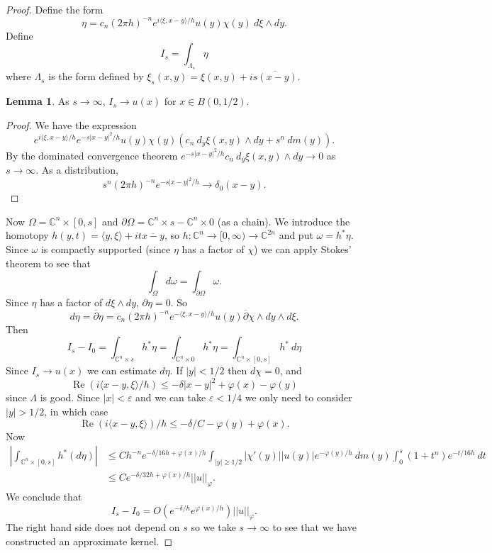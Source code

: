 \documentclass[12pt]{report}
\newcommand{\CC}{\mathbb{C}}
\newcommand{\dbar}{\overline \partial}
\renewcommand{\Re}{\operatorname{Re}}
\theoremstyle{definition}
\newtheorem{lemma}[theorem]{Lemma}
\begin{document}
\begin{proof}
    Define the form
    $$\eta = c_n(2\pi h)^{-n} e^{i\langle \xi, x - y\rangle/h} u(y)\chi(y) ~d\xi \wedge dy.$$
    Define $$I_s = \int_{\Lambda_s} \eta$$
    where $\Lambda_s$ is the form defined by $\xi_s(x, y) = \xi(x, y) + i\overline{s(x - y)}$.
\begin{lemma}
    As $s \to \infty$, $I_s \to u(x)$ for $x \in B(0, 1/2)$.
\end{lemma}
\begin{proof}
    We have the expression
    $$e^{i\langle\xi, x - y\rangle/h} e^{-s|x - y|^2/h} u(y) \chi(y)(c_n ~d_{\overline y} \xi(x, y) \wedge dy + s^n~dm(y)).$$
    By the dominated convergence theorem $e^{-s|x-y|^2/h}c_n~d_{\overline y}\xi(x, y) \wedge dy \to 0$ as $s \to \infty$. As a distribution,
    $$s^n(2\pi h)^{-n} e^{-s|x - y|^2/h} \to \delta_0(x - y).$$
\end{proof}
Now $\Omega = \CC^n \times [0, s]$ and $\partial \Omega = \CC^n \times s - \CC^n \times 0$ (as a chain). We introduce the homotopy $h(y, t) = \langle y, \xi\rangle + it\overline{x - y}$, so $h: \CC^n \to [0, \infty) \to \CC^{2n}$ and put $\omega = h^*\eta$. Since $\omega$ is compactly supported (since $\eta$ has a factor of $\chi$) we can apply Stokes' theorem to see that
    $$\int_\Omega d\omega = \int_{\partial \Omega} \omega.$$
    Since $\eta$ has a factor of $d\xi \wedge dy$, $\partial \eta = 0$. So
    $$d\eta = \dbar \eta = c_n(2\pi h)^{-n} e^{-\langle \xi, x-y\rangle/h} u(y) \dbar \chi \wedge dy \wedge d\xi.$$
    Then
$$
    I_s - I_0 = \int_{\CC^n \times s} h^*\eta = \int_{\CC^n \times 0} h^*\eta = \int_{\CC^n \times [0, s]} h^*~d\eta
$$
    Since $I_s \to u(x)$ we can estimate $d\eta$. If $|y| < 1/2$ then $d\chi = 0$, and
    $$\Re (i\langle x - y, \xi\rangle/h) \leq -\delta|x-y|^2 + \varphi(x) - \varphi(y)$$
    since $\Lambda$ is good. Since $|x| < \varepsilon$ and we can take $\varepsilon < 1/4$ we only need to consider $|y| > 1/2$, in which case
    $$\Re(i\langle x - y, \xi\rangle)/h \leq -\delta/C - \varphi(y) + \varphi(x).$$
    Now
\begin{align*}
    \left|\int_{\CC^n \times [0, s]} h^*(d\eta)\right| &\leq Ch^{-n} e^{-\delta/16h + \varphi(x)/h} \int_{|y| \geq 1/2} |\chi'(y)| |u(y)|e^{-\varphi(y)/h} ~dm(y) \int_0^s (1 + t^n)e^{-t/16h} ~dt\\
    &\leq Ce^{-\delta/32h + \varphi(x)/h}||u||_\varphi.
\end{align*}
    We conclude that
    $$I_s - I_0 = O(e^{-\delta/h}e^{\varphi(x)/h})||u||_\varphi.$$
    The right hand side does not depend on $s$ so we take $s \to \infty$ to see that we have constructed an approximate kernel.
\end{proof}
\end{document}

